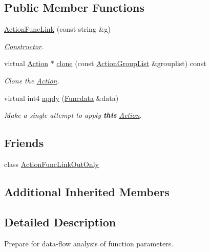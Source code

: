 \subsection*{Public Member Functions}
\begin{DoxyCompactItemize}
\item 
\mbox{\hyperlink{class_action_func_link_a7343d5597b3978a9f4221894d29139b6}{Action\+Func\+Link}} (const string \&g)
\begin{DoxyCompactList}\small\item\em \mbox{\hyperlink{class_constructor}{Constructor}}. \end{DoxyCompactList}\item 
virtual \mbox{\hyperlink{class_action}{Action}} $\ast$ \mbox{\hyperlink{class_action_func_link_a58d93701c5e89f1128b0b4e0f770f56a}{clone}} (const \mbox{\hyperlink{class_action_group_list}{Action\+Group\+List}} \&grouplist) const
\begin{DoxyCompactList}\small\item\em Clone the \mbox{\hyperlink{class_action}{Action}}. \end{DoxyCompactList}\item 
virtual int4 \mbox{\hyperlink{class_action_func_link_aea1b5a423e2affec2131468fc23a6a3e}{apply}} (\mbox{\hyperlink{class_funcdata}{Funcdata}} \&data)
\begin{DoxyCompactList}\small\item\em Make a single attempt to apply {\bfseries{this}} \mbox{\hyperlink{class_action}{Action}}. \end{DoxyCompactList}\end{DoxyCompactItemize}
\subsection*{Friends}
\begin{DoxyCompactItemize}
\item 
class \mbox{\hyperlink{class_action_func_link_ae931d39a97f0aff12db20f78af1206d2}{Action\+Func\+Link\+Out\+Only}}
\end{DoxyCompactItemize}
\subsection*{Additional Inherited Members}


\subsection{Detailed Description}
Prepare for data-\/flow analysis of function parameters. 

